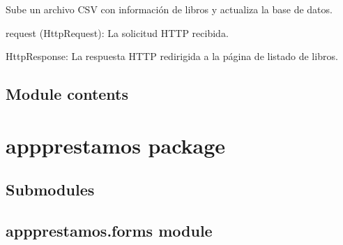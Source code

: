 \documentclass[letterpaper,10pt,spanish]{sphinxmanual}
\begin{document}

\begin{fulllineitems}
\label{\detokenize{modules/appejemplares:appejemplares.views.subir_csv}}
\pysigstartsignatures
{}
\pysigstopsignatures
\sphinxAtStartPar
Sube un archivo CSV con información de libros y actualiza la base de datos.
\begin{description}
\sphinxAtStartPar
request (HttpRequest): La solicitud HTTP recibida.

\sphinxAtStartPar
HttpResponse: La respuesta HTTP redirigida a la página de listado de libros.

\end{description}

\end{fulllineitems}



\section{Module contents}
\label{\detokenize{modules/appejemplares:module-appejemplares}}\label{\detokenize{modules/appejemplares:module-contents}}
\sphinxstepscope


\chapter{appprestamos package}
\label{\detokenize{modules/appprestamos:appprestamos-package}}\label{\detokenize{modules/appprestamos::doc}}

\section{Submodules}
\label{\detokenize{modules/appprestamos:submodules}}

\section{appprestamos.forms module}
\label{\detokenize{modules/appprestamos:module-appprestamos.forms}}\label{\detokenize{modules/appprestamos:appprestamos-forms-module}}
\end{document}
